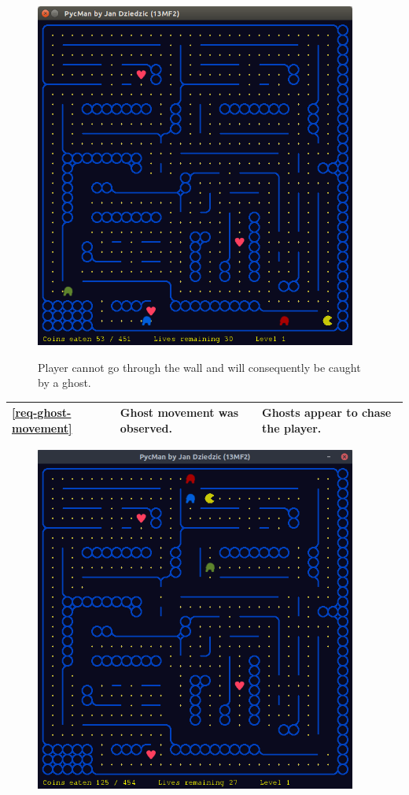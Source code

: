 \documentclass[11pt,a4paper,notitlepage]{report}
\newenvironment{img}{
	\begin{center}
		\begin{figure}[H]
			\begin{center}
			
}{
	\end{center}
		\end{figure}
			\end{center}
}
\begin{document}
\begin{center}
\begin{img}
					\includegraphics[width=300pt]{images/player-cant-go-thru-wall.png}\\
					\caption{Player cannot go through the wall and will consequently be caught by a ghost.}
				\end{img}
				\begin{longtable}{ | p{2cm} | p{5cm} | p{4cm} |}
					\hline	
					\ref{req-ghost-movement}&Ghost movement was observed.&Ghosts appear to chase the player.\\ \hline
				\end{longtable}
				\begin{img}
					\includegraphics[width=300pt]{images/ghosts-chasing0.png}\\

\end{img}
\end{center}
\end{document}

